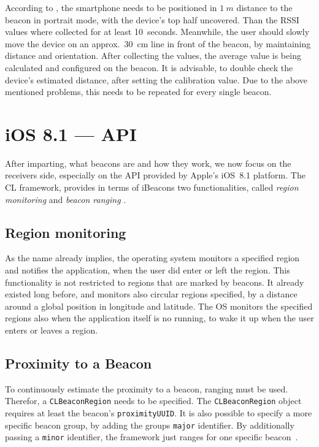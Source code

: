 According to \citet{apple:getting_started}, the smartphone needs to be positioned in $1~m$ distance to the beacon in portrait mode, with the device's top half uncovered. Than the \ac{RSSI} values where collected for at least 10~seconds. Meanwhile, the user should slowly move the device on an approx.\ 30~cm line in front of the beacon, by maintaining distance and orientation. After collecting the values, the average value is being calculated and configured on the beacon. It is advisable, to double check the device's estimated distance, after setting the calibration value. Due to the above mentioned problems, this needs to be repeated for every single beacon.

\section{iOS 8.1 --- API}
After imparting, what beacons are and how they work, we now focus on the receivers side, especially on the \acs{API} provided by Apple's iOS~8.1 platform. The \ac{CL} framework, provides in terms of iBeacons two functionalities, called \emph{region monitoring} and \emph{beacon ranging} \citep{apple:ios_doc_cl}.

\subsection*{Region monitoring}
As the name already implies, the operating system monitors a specified region and notifies the application, when the user did enter or left the region. This functionality is not restricted to regions that are marked by beacons. It already existed long before, and monitors also circular regions specified, by a distance around a global position in longitude and latitude.
The \ac{OS} monitors the specified regions also when the application itself is no running, to wake it up when the user enters or leaves a region.

\subsection*{Proximity to a Beacon}
To continuously estimate the proximity to a beacon, ranging must be used. Therefor, a \texttt{CLBeaconRegion} needs to be specified. The \texttt{CLBeaconRegion} object requires at least the beacon's \texttt{proximityUUID}. It is also possible to specify a more specific beacon group, by adding the groups \texttt{major} identifier. By additionally passing a \texttt{minor} identifier, the framework just ranges for one specific beacon~\citep{apple:ios_doc_cl}.

